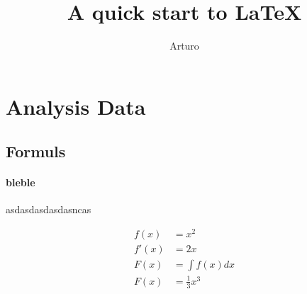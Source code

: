 \documentclass{article}
\author{Arturo}
\title{A quick start to \LaTeX{}} %
\begin{document}
\section{Analysis Data} %
\subsection{Formuls}
\paragraph{bleble}
asdasdasdasdasncas



\begin{align}
f(x) &= x^2\\
f'(x) &= 2x\\
F(x) &= \int f(x)dx\\
F(x) &= \frac{1}{3}x^3
\end{align}
\end{document}

